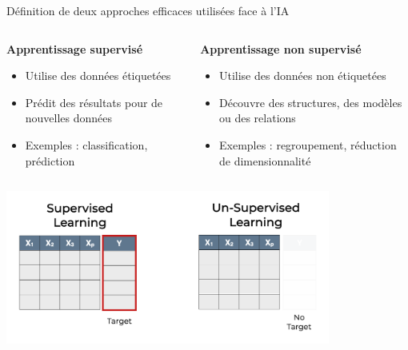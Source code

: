 \documentclass{beamer}
\begin{document}
\begin{frame}{Définition de deux approches efficaces utilisées face à l'IA}
	\begin{columns}[T]
		\begin{column}{0.5\textwidth}
			\textbf{Apprentissage supervisé}
			\begin{itemize}
				\item Utilise des données étiquetées
				\item Prédit des résultats pour de nouvelles données
				\item Exemples : classification, prédiction
			\end{itemize}
		\end{column}
		\begin{column}{0.5\textwidth}
			\textbf{Apprentissage non supervisé}
			\begin{itemize}
				\item Utilise des données non étiquetées
				\item Découvre des structures, des modèles ou des relations
				\item Exemples : regroupement, réduction de dimensionnalité
			\end{itemize}
		\end{column}
	\end{columns}
	\vspace{0.5cm}
	\centering
	\includegraphics[width=0.8\textwidth]{approachesdata.png}
\end{frame}
\end{document}
